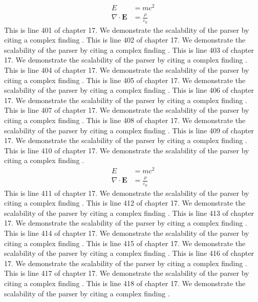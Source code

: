 \begin{align*}
  E &= mc^2 \\
  \nabla \cdot \mathbf{E} &= \frac{\rho}{\varepsilon_0}
\end{align*}
This is line 401 of chapter 17. We demonstrate the scalability of the parser by citing a complex finding \cite{ref17_401}.
This is line 402 of chapter 17. We demonstrate the scalability of the parser by citing a complex finding \cite{ref17_402}.
This is line 403 of chapter 17. We demonstrate the scalability of the parser by citing a complex finding \cite{ref17_403}.
This is line 404 of chapter 17. We demonstrate the scalability of the parser by citing a complex finding \cite{ref17_404}.
This is line 405 of chapter 17. We demonstrate the scalability of the parser by citing a complex finding \cite{ref17_405}.
This is line 406 of chapter 17. We demonstrate the scalability of the parser by citing a complex finding \cite{ref17_406}.
This is line 407 of chapter 17. We demonstrate the scalability of the parser by citing a complex finding \cite{ref17_407}.
This is line 408 of chapter 17. We demonstrate the scalability of the parser by citing a complex finding \cite{ref17_408}.
This is line 409 of chapter 17. We demonstrate the scalability of the parser by citing a complex finding \cite{ref17_409}.
This is line 410 of chapter 17. We demonstrate the scalability of the parser by citing a complex finding \cite{ref17_410}.
\begin{align*}
  E &= mc^2 \\
  \nabla \cdot \mathbf{E} &= \frac{\rho}{\varepsilon_0}
\end{align*}
This is line 411 of chapter 17. We demonstrate the scalability of the parser by citing a complex finding \cite{ref17_411}.
This is line 412 of chapter 17. We demonstrate the scalability of the parser by citing a complex finding \cite{ref17_412}.
This is line 413 of chapter 17. We demonstrate the scalability of the parser by citing a complex finding \cite{ref17_413}.
This is line 414 of chapter 17. We demonstrate the scalability of the parser by citing a complex finding \cite{ref17_414}.
This is line 415 of chapter 17. We demonstrate the scalability of the parser by citing a complex finding \cite{ref17_415}.
This is line 416 of chapter 17. We demonstrate the scalability of the parser by citing a complex finding \cite{ref17_416}.
This is line 417 of chapter 17. We demonstrate the scalability of the parser by citing a complex finding \cite{ref17_417}.
This is line 418 of chapter 17. We demonstrate the scalability of the parser by citing a complex finding \cite{ref17_418}.
